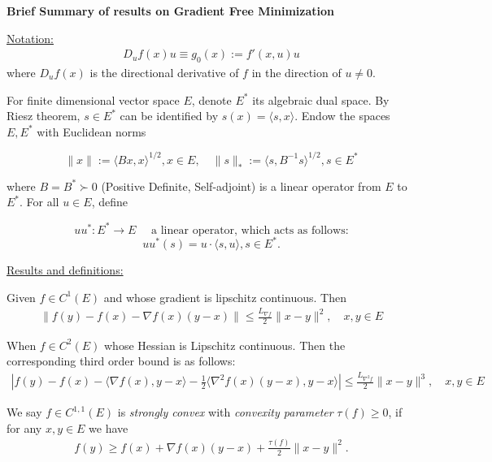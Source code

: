 \documentclass{article}
\begin{document}
\begin{center} \textbf{Brief Summary of results on Gradient Free Minimization} \end{center}
\underline{Notation:}
\begin{align}
    D_uf(x)u \equiv g_0(x):= f'(x,u)u
\end{align}
where $D_uf(x)$ is the directional derivative of $f$ in the direction of $u \neq 0$. \newline

For finite dimensional vector space $E$, denote $E^*$ its algebraic dual space. By Riesz theorem, $s \in E^*$ can be identified by $s(x) = \langle s,x\rangle$. Endow the spaces $E, E^*$ with Euclidean norms 

$$ \|x \| := \langle Bx,x\rangle^{1/2}, x \in E, \quad \|s\|_*:= \langle s, B^{-1}s\rangle^{1/2}, s \in E^* $$

where $B = B^* \succ 0$ (Positive Definite, Self-adjoint) is a linear operator from $E$ to $E^*$. For all $u \in E$, define 

$$ uu^*: E^* \to E \quad \text{ a linear operator, which acts as follows:} $$
$$ uu^*(s) = u \cdot \langle s,u\rangle, s \in E^*. $$ 

\underline{Results and definitions:} \newline 

Given $f \in C^1(E)$ and whose gradient is lipschitz continuous. Then 
\begin{align}
    \| f(y) - f(x) - \nabla f(x)(y-x)\| \leq \frac{L_{\nabla f}}{2}\|x-y\|^2, \quad x,y \in E \label{second_order_bound}
\end{align}

When $f \in C^2(E)$ whose Hessian is Lipschitz continuous. Then the corresponding third order bound is as follows:
\begin{align}
    | f(y) - f(x) - \langle \nabla f(x), y-x\rangle - \frac{1}{2}\langle \nabla^2 f(x)(y-x),y-x\rangle | \leq \frac{L_{\nabla^2 f}}{2}\|x-y\|^3, \quad x,y \in E
\end{align}

\begin{definition} We say $f \in C^{1,1}(E)$ is \textit{strongly convex} with \textit{convexity parameter} $\tau(f) \geq 0$, if for any $x,y \in E$ we have 
\begin{align}
    f(y) \geq f(x) + \nabla f(x)(y-x) + \frac{\tau(f)}{2}\|x-y\|^2.
\end{align}
\end{definition}
\end{document}
